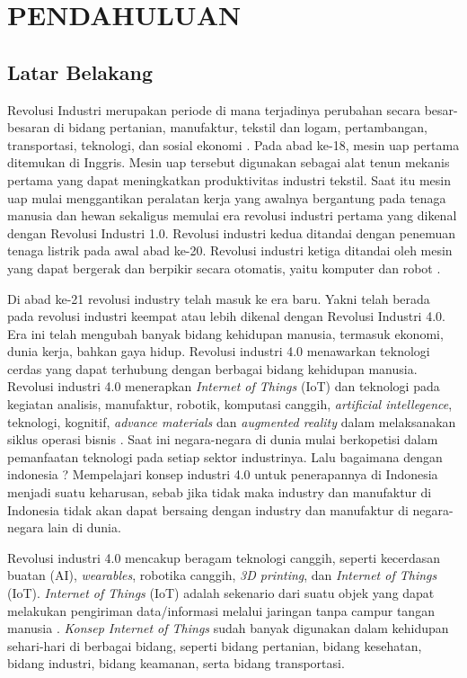 \chapter{PENDAHULUAN}

\section{Latar Belakang}
Revolusi Industri merupakan periode di mana terjadinya perubahan secara besar-besaran di bidang pertanian, manufaktur, tekstil dan logam, pertambangan, transportasi, teknologi, dan sosial ekonomi . Pada abad ke-18, mesin uap pertama ditemukan di Inggris. Mesin uap tersebut digunakan sebagai alat tenun mekanis pertama yang dapat meningkatkan produktivitas industri tekstil. Saat itu mesin uap mulai menggantikan peralatan kerja yang awalnya bergantung pada tenaga manusia dan hewan sekaligus memulai era revolusi industri pertama yang dikenal dengan Revolusi Industri 1.0. Revolusi industri kedua ditandai dengan penemuan tenaga listrik pada awal abad ke-20. Revolusi industri ketiga ditandai oleh mesin yang dapat bergerak dan berpikir secara otomatis, yaitu komputer dan robot . 

Di abad ke-21 revolusi industry telah masuk ke era baru. Yakni telah berada pada revolusi industri keempat atau lebih dikenal dengan Revolusi Industri 4.0. Era ini telah mengubah banyak bidang kehidupan manusia, termasuk ekonomi, dunia kerja, bahkan gaya hidup. Revolusi industri 4.0 menawarkan teknologi cerdas yang dapat terhubung dengan berbagai bidang kehidupan manusia. Revolusi industri 4.0 menerapkan \textit{Internet of Things} (IoT) dan teknologi pada kegiatan analisis, manufaktur, robotik, komputasi canggih, \textit{artificial intellegence}, teknologi, kognitif, \textit{advance materials} dan \textit{augmented reality} dalam melaksanakan siklus operasi bisnis . Saat ini negara-negara di dunia mulai berkopetisi dalam pemanfaatan teknologi pada setiap sektor industrinya. Lalu bagaimana dengan indonesia ? Mempelajari konsep industri 4.0 untuk penerapannya di Indonesia menjadi suatu keharusan, sebab jika tidak maka industry dan manufaktur di Indonesia tidak akan dapat bersaing dengan industry dan manufaktur di negara-negara lain di dunia.

Revolusi industri 4.0 mencakup beragam teknologi canggih, seperti kecerdasan buatan (AI), \textit{wearables}, robotika canggih, \textit{3D printing}, dan \textit{Internet of Things} (IoT). \textit{Internet of Things} (IoT) adalah sekenario dari suatu objek yang dapat melakukan pengiriman data/informasi melalui jaringan tanpa campur tangan manusia . \textit{Konsep Internet of Things} sudah banyak digunakan dalam kehidupan sehari-hari di berbagai bidang, seperti bidang pertanian, bidang kesehatan, bidang industri, bidang keamanan, serta bidang transportasi.

